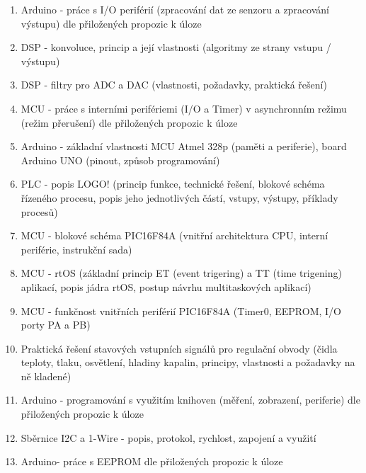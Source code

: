 \documentclass[11pt]{article}
\begin{document}
\begin{enumerate}
            \item Arduino - práce s I/O periférií (zpracování dat ze senzoru a zpracování výstupu) dle přiložených propozic k úloze
            \item DSP - konvoluce, princip a její vlastnosti (algoritmy ze strany vstupu / výstupu)
            \item DSP - filtry pro ADC a DAC (vlastnosti, požadavky, praktická řešení)
            \item MCU - práce s interními perifériemi (I/O a Timer) v asynchronním režimu (režim přerušení) dle přiložených propozic k úloze
            \item Arduino - základní vlastnosti MCU Atmel 328p (paměti a periferie), board Arduino UNO (pinout, způsob programování)
            \item PLC - popis LOGO! (princip funkce, technické řešení, blokové schéma řízeného procesu, popis jeho jednotlivých částí, vstupy, výstupy, příklady procesů)
            \item MCU - blokové schéma PIC16F84A (vnitřní architektura CPU, interní periférie, instrukční sada)
            \item MCU - rtOS (základní princip ET (event trigering) a TT (time trigening) aplikací, popis jádra rtOS, postup návrhu multitaskových aplikací)
            \item MCU - funkčnost vnitřních periférií PIC16F84A (Timer0, EEPROM, I/O porty PA a PB)
            \item Praktická řešení stavových vstupních signálů pro regulační obvody (čidla teploty, tlaku, osvětlení, hladiny kapalin, principy, vlastnosti a požadavky na ně kladené)
            \item Arduino - programování s využitím knihoven (měření, zobrazení, periferie) dle přiložených propozic k úloze
            \item Sběrnice I2C a 1-Wire - popis, protokol, rychlost, zapojení a využití
            \item Arduino- práce s EEPROM dle přiložených propozic k úloze
        \end{enumerate}
\end{document}
